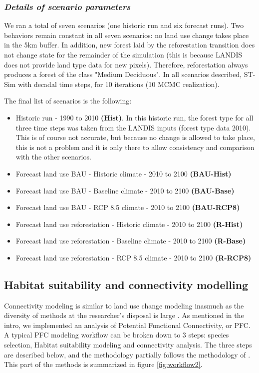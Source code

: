 \subsubsection*{\textit{Details of scenario parameters}}

We ran a total of seven scenarios (one historic run and six forecast runs). Two behaviors remain constant in all seven scenarios: no land use change  takes place in the 5km buffer. In addition, new forest laid by the reforestation transition does not change state for the remainder of the simulation (this is because LANDIS does not provide land type data for new pixels). Therefore, reforestation always produces a forest of the class "Medium Deciduous". In all scenarios described, ST-Sim with decadal time steps, for 10 iterations (10 MCMC realization).

The final list of scenarios is the following:
\begin{itemize}
\item Historic run - 1990 to 2010 \textbf{(Hist)}. In this historic run, the forest type for all three time steps was taken from the LANDIS inputs (forest type data 2010). This is of course not accurate, but because no change is allowed to take place, this is not a problem and it is only there to allow consistency and comparison with the other scenarios.
\item Forecast land use BAU - Historic climate - 2010 to 2100 \textbf{(BAU-Hist)}
\item Forecast land use BAU - Baseline climate - 2010 to 2100 \textbf{(BAU-Base)}
\item Forecast land use BAU - RCP 8.5 climate - 2010 to 2100 \textbf{(BAU-RCP8)}
\item Forecast land use reforestation - Historic climate - 2010 to 2100 \textbf{(R-Hist)}
\item Forecast land use reforestation - Baseline climate - 2010 to 2100 \textbf{(R-Base)}
\item Forecast land use reforestation - RCP 8.5 climate - 2010 to 2100 \textbf{(R-RCP8)}\\
\end{itemize}

\subsection{Habitat suitability and connectivity modelling}

Connectivity modeling is similar to land use change modeling inasmuch as the diversity of methods at the researcher’s disposal is large \citep{calabrese_comparison_2004}. As mentioned in the intro, we implemented an analysis of Potential Functional Connectivity, or PFC. A typical PFC modeling workflow can be broken down to 3 steps: species selection, Habitat suitability modeling and connectivity analysis. The three steps are described below, and the methodology partially follows the methodology of \cite{rayfield_priorisation_2018}. This part of the methods is summarized in figure \ref{fig:workflow2}.\\

